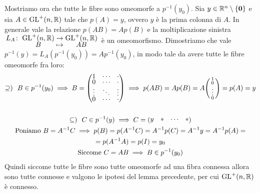\begin{demonstration}
	Mostriamo ora che tutte le fibre sono omeomorfe a $p^{-1}(y_0)$. Sia $y\in\mathbb{R}^n\setminus\{\mathbf{0}\}$ e sia $A\in\operatorname{GL}^+(n,\mathbb{R})$ tale che $p(A)=y$, ovvero $y$ è la prima colonna di $A$. In generale vale la relazione $p(AB)=Ap(B)$ e la moltiplicazione sinistra $\displaystyle \funztot {L_A} {\gl^+(n,\realset)} {\gl^+(n,\realset)} B {AB}$ è un omeomorfismo. Dimostriamo che vale $p^{-1}(y)=L_A\left( p^{-1}(y_0)\right)=Ap^{-1}(y_0)$, in modo tale da avere tutte le fibre omeomorfe fra loro:
		\begin{gather*}
			\supseteq ) \ \ B\in p^{-1}(y_0) \implies B=\begin{pmatrix}
				1	   & \cdots  & \cdot  \\
				0 	   & \cdots  & \cdot   \\
				\vdots & \ddots  & \vdots   \\
				0      & \cdots  & \cdot
			\end{pmatrix} \implies	p(AB)=Ap(B)=A\begin{psmallmatrix}
					1 \\ 0 \\ \vdots \\ 0
				\end{psmallmatrix}= p(A)=y \\
			\\
			\subseteq ) \ \  C\in p^{-1}(y) \implies C=\begin{pmatrix}
				y & * & \cdots & *
				\end{pmatrix}\\
			\text{Poniamo } B=A^{-1}C\implies p(B)=p(A^{-1}C)=A^{-1}p(C)=A^{-1}y=A^{-1}p(A)=\\
			=p(A^{-1}A)=p(I)=y_0\\
			\text{Siccome } C=AB \implies B\in p^{-1}(y_0)
		\end{gather*}
	Quindi siccome tutte le fibre sono tutte omeomorfe ad una fibra connessa allora sono tutte connesse e valgono le ipotesi del lemma precedente, per cui $\operatorname{GL}^+(n,\mathbb{R})$ è connesso.
\end{demonstration}

\begin{observe}
	
\end{observe}

\begin{theorema}
	
\end{theorema}
\begin{demonstration}
	
\end{demonstration}

\begin{observe}
	
\end{observe}